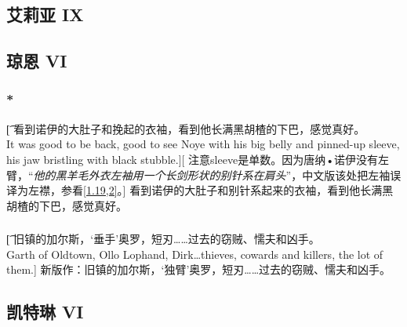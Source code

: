 \documentclass[12pt,a4paper]{article}
\begin{document}
\subsection{艾莉亚 IX}

	
\subsection{琼恩 VI}
\subsubsection{\color{red}*}\label{3.48.1}\t[
看到诺伊的大肚子和挽起的衣袖，看到他长满黑胡楂的下巴，感觉真好。\\
It was good to be back, good to see Noye with his big belly and pinned-up sleeve, his jaw bristling with black stubble.][
注意sleeve是单数。因为唐纳•诺伊没有左臂，“\emph{他的黑羊毛外衣左袖用一个长剑形状的别针系在肩头}”，中文版该处把左袖误译为左襟，参看\ref{1.19,2}。]
看到诺伊的大肚子和别针系起来的衣袖，看到他长满黑胡楂的下巴，感觉真好。

\subsubsection{}\t[
旧镇的加尔斯，‘垂手’奥罗，短刃……过去的窃贼、懦夫和凶手。\\
Garth of Oldtown, Ollo Lophand, Dirk\ldots thieves, cowards and killers, the lot of them.]
新版作：旧镇的加尔斯，‘独臂’奥罗，短刃……过去的窃贼、懦夫和凶手。

\subsection{凯特琳 VI}
\end{document}
